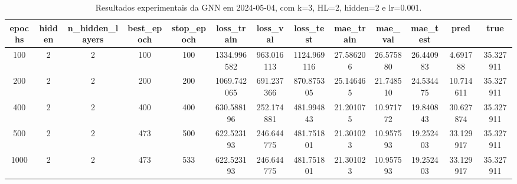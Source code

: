 \begin{table}[h]
\centering
\caption{Resultados experimentais da GNN em 2024-05-04, com k=3, HL=2, hidden=2 e lr=0.001.}
\label{tab:gnn_results_k3_hl2_h2_d20240504}
\begin{tabular}{ccccccccccccc}
\toprule
epochs & hidden & n\_hidden\_layers & best\_epoch & stop\_epoch & loss\_train & loss\_val & loss\_test & mae\_train & mae\_val & mae\_test & pred & true \\
\midrule
100 & 2 & 2 & 100 & 100 & 1334.996582 & 963.016113 & 1124.969116 & 27.586206 & 26.575880 & 26.440983 & 4.691788 & 35.327911 \\
200 & 2 & 2 & 200 & 200 & 1069.742065 & 691.237366 & 870.875305 & 25.146465 & 21.748510 & 24.534475 & 10.714611 & 35.327911 \\
400 & 2 & 2 & 400 & 400 & 630.588196 & 252.174881 & 481.994843 & 21.201075 & 10.971772 & 19.840843 & 30.627874 & 35.327911 \\
500 & 2 & 2 & 473 & 500 & 622.523193 & 246.644775 & 481.751801 & 21.301023 & 10.957593 & 19.252403 & 33.129917 & 35.327911 \\
1000 & 2 & 2 & 473 & 533 & 622.523193 & 246.644775 & 481.751801 & 21.301023 & 10.957593 & 19.252403 & 33.129917 & 35.327911 \\
\bottomrule
\end{tabular}
\end{table}
